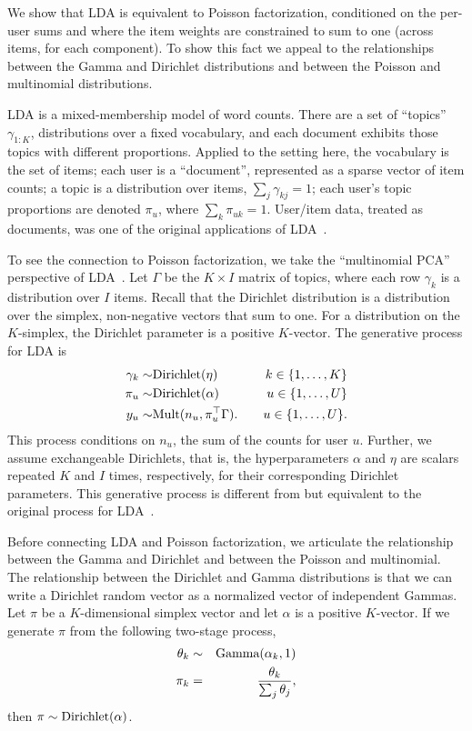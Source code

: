 \documentclass{sig-alternate}
\begin{document}
We show that LDA is equivalent to Poisson factorization, conditioned
on the per-user sums and where the item weights are constrained to sum
to one (across items, for each component).  To show this fact we
appeal to the relationships between the Gamma and Dirichlet
distributions and between the Poisson and multinomial distributions.

LDA is a mixed-membership model of word counts.  There are a set of
``topics'' $\gamma_{1:K}$, distributions over a fixed vocabulary, and
each document exhibits those topics with different proportions.
Applied to the setting here, the vocabulary is the set of items; each
user is a ``document'', represented as a sparse vector of item counts;
a topic is a distribution over items, $\sum_{j} \gamma_{kj} = 1$; each
user's topic proportions are denoted $\pi_u$, where $\sum_k \pi_{uk} =
1$.  User/item data, treated as documents, was one of the original
applications of LDA~\cite{Blei:2003b}.

To see the connection to Poisson factorization, we take the
``multinomial PCA'' perspective of LDA~\cite{Buntine:2004}.  Let
$\Gamma$ be the $K \times I$ matrix of topics, where each row
$\gamma_k$ is a distribution over $I$ items.  Recall that the
Dirichlet distribution is a distribution over the simplex,
non-negative vectors that sum to one.  For a distribution on the
$K$-simplex, the Dirichlet parameter is a positive $K$-vector.  The
generative process for LDA is
\begin{eqnarray*}
  \gamma_k \sim & \textrm{Dirichlet}(\eta) & \quad k \in \{1, \ldots,
  K\} \\
  \pi_u  \sim &\textrm{Dirichlet}(\alpha) & \quad u \in \{1, \ldots, U\}
  \\
  y_u \sim & \textrm{Mult}(n_u, \pi_u^\top \Gamma). & \quad u \in
  \{1, \ldots, U\}.
\end{eqnarray*}
This process conditions on $n_u$, the sum of the counts for user $u$.
Further, we assume exchangeable Dirichlets, that is, the
hyperparameters $\alpha$ and $\eta$ are scalars repeated $K$ and $I$
times, respectively, for their corresponding Dirichlet parameters.
This generative process is different from but equivalent to the
original process for LDA~\cite{Blei:2003b}.

Before connecting LDA and Poisson factorization, we articulate the
relationship between the Gamma and Dirichlet and between the Poisson
and multinomial.  The relationship between the Dirichlet and Gamma
distributions is that we can write a Dirichlet random vector as a
normalized vector of independent Gammas.  Let $\pi$ be a
$K$-dimensional simplex vector and let $\alpha$ is a positive
$K$-vector.  If we generate $\pi$ from the following two-stage
process,
\begin{eqnarray*}
  \theta_k &\sim& \textrm{Gamma}(\alpha_k, 1) \\
  \pi_k &=& \frac{\theta_k}{\sum_{j} \theta_j},
\end{eqnarray*}
then $\pi \sim \textrm{Dirichlet}(\alpha)$.
\end{document}

